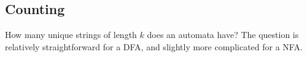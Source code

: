 \subsection{Counting}
How many unique strings of length \(k\) does an automata have?
The question is relatively straightforward for a DFA,
and slightly more complicated for a NFA.



